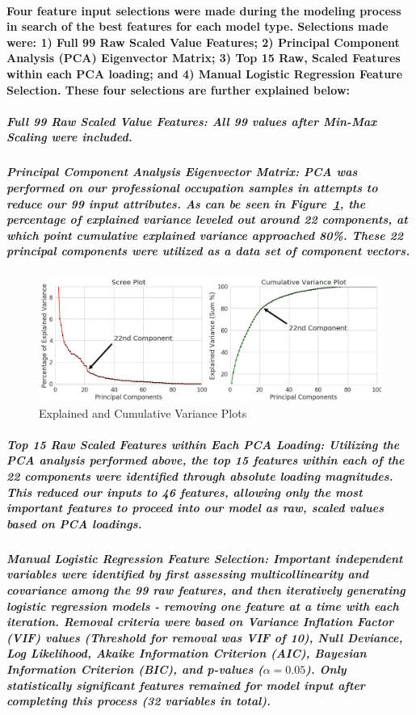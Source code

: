 \documentclass[10pt]{article}
\begin{document}
\paragraph{Four feature input selections were made during the modeling process in search of the best features for each model type. Selections made were: 1) Full 99 Raw Scaled Value Features; 2) Principal Component Analysis (PCA) Eigenvector Matrix; 3) Top 15 Raw, Scaled Features within each PCA loading; and 4) Manual Logistic Regression Feature Selection.  These four selections are further explained below:}

\subparagraph{\textit{Full 99 Raw Scaled Value Features}: All 99 values after Min-Max Scaling were included.}

\subparagraph{\textit{Principal Component Analysis Eigenvector Matrix}: PCA was performed on our professional occupation samples in attempts to reduce our 99 input attributes. As can be seen in Figure~\ref{fig:PCA_Scree_CumVar}, the percentage of explained variance leveled out around 22 components, at which point cumulative explained variance approached 80\%. These 22 principal components were utilized as a data set of component vectors.}

\subparagraph{}
\begin{figure}[H]
\centering
\includegraphics[width=\linewidth]{PCA_Scree_CumVar.jpg}
\caption{Explained and Cumulative Variance Plots}
\label{fig:PCA_Scree_CumVar}
\end{figure}

\subparagraph{\textit{Top 15 Raw Scaled Features within Each PCA Loading}: Utilizing the PCA analysis performed above, the top 15 features within each of the 22 components were identified through absolute loading magnitudes. This reduced our inputs to 46 features, allowing only the most important features to proceed into our model as raw, scaled values based on PCA loadings.}

\subparagraph{\textit{Manual Logistic Regression Feature Selection}: Important independent variables were identified by first assessing multicollinearity and covariance among the 99 raw features, and then iteratively generating logistic regression models - removing one feature at a time with each iteration. Removal criteria were based on Variance Inflation Factor (VIF) values (Threshold for removal was VIF of 10), Null Deviance, Log Likelihood, Akaike Information Criterion (AIC), Bayesian Information Criterion (BIC), and p-values ($\alpha = 0.05$). Only statistically significant features remained for model input after completing this process (32 variables in total).}
 
\end{document}
